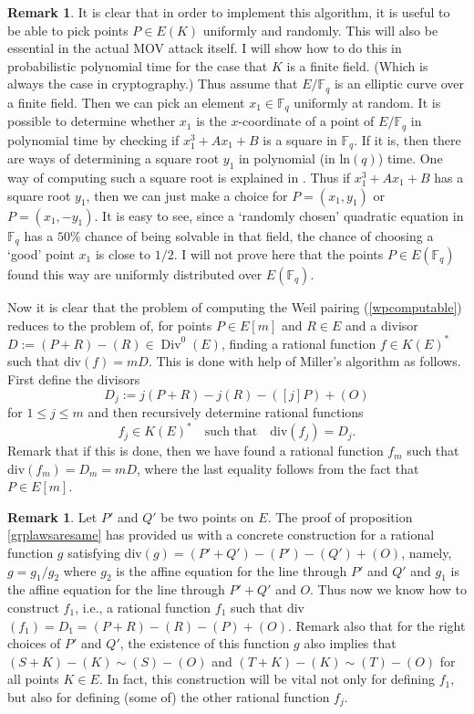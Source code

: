\documentclass{article}
\numberwithin{equation}{section}
\theoremstyle{definition}
\newtheorem{remark}[theorem]{Remark}
\newcommand{\FF}[1]{{\mathbb F}_{#1}} %
\newcommand{\Div}{\operatorname{Div}} %
\begin{document}
\begin{remark}\label{unirandompts}
It is clear that in order to implement this algorithm, it is useful to be able to pick points $P \in E(K)$ uniformly and randomly. This will also be essential in the actual MOV attack itself. I will show how to do this in probabilistic polynomial time for the case that $K$ is a finite field. (Which is always the case in cryptography.) Thus assume that $E/\FF{q}$ is an elliptic curve over a finite field. Then we can pick an element $x_1\in\FF{q}$ uniformly at random. It is possible to determine whether $x_1$ is the $x$-coordinate of a point of $E/\FF{q}$ in polynomial time by checking if $x_1^3+Ax_1+B$ is a square in $\FF{q}$. If it is, then there are ways of determining a square root $y_1$ in polynomial (in ln$(q)$) time. One way of computing such a square root is explained in \cite{Ben-OR}. Thus if $x_1^3+Ax_1+B$ has a square root $y_1$, then we can just make a choice for $P =(x_1,y_1)$ or $P=(x_1,-y_1)$. It is easy to see, since a `randomly chosen' quadratic equation in $\FF{q}$ has a $50\%$ chance of being solvable in that field, the chance of choosing a `good' point $x_1$ is close to $1/2$. I will not prove here that the points $P \in E(\FF{q})$ found this way are uniformly distributed over $E(\FF{q})$.
\end{remark}

Now it is clear that the problem of computing the Weil pairing (\ref{wpcomputable}) reduces to the problem of, for points $P \in E[m]$ and $R \in E$ and a divisor $D:=(P+R)-(R) \in \Div^0(E)$, finding a rational function $f \in K(E)^*$ such that div$(f)=mD$. This is done with help of Miller's algorithm as follows. First define the divisors 
\begin{equation}\label{jthdivisor}D_j:=j(P+R)-j(R)-([j]P)+(O)\end{equation} 
for $1 \leq j \leq m$ and then recursively determine rational functions 
$$f_j \in K(E)^* \quad \text{such that} \quad \text{div}(f_j) = D_j.$$ 
Remark that if this is done, then we have found a rational function $f_m$ such that div$(f_m)=D_m=mD$, where the last equality follows from the fact that $P \in E[m]$.

\begin{remark}\label{milleralgbasis} Let $P'$ and $Q'$ be two points on $E$. The proof of proposition \ref{grplawsaresame} has provided us with a concrete construction for a rational function $g$ satisfying div$(g)=(P'+Q')-(P')-(Q')+(O)$, namely, $g=g_1/g_2$ where $g_2$ is the affine equation for the line through $P'$ and $Q'$ and $g_1$ is the affine equation for the line through $P'+Q'$ and $O$. Thus now we know how to construct $f_1$, i.e., a rational function $f_1$ such that div$(f_1)=D_1=(P+R)-(R)-(P)+(O)$. Remark also that for the right choices of $P'$ and $Q'$, the existence of this function $g$ also implies that $(S+K)-(K) \sim (S)-(O)$ and $(T+K)-(K) \sim (T)-(O)$ for all points $K\in E$. In fact, this construction will be vital not only for defining $f_1$, but also for defining (some of) the other rational function $f_j$.
\end{remark}
\end{document}
